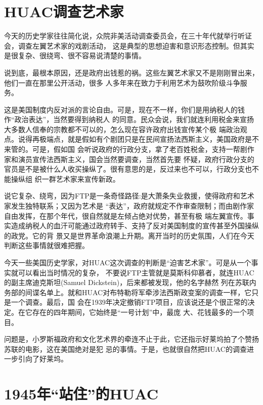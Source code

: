 \documentclass[10pt]{article}
\begin{document}
{

\pagebreak
\section{HUAC调查艺术家}

今天的历史学家往往简化说，众院非美活动调查委员会，在三十年代就举行听证会，调查左翼艺术家的戏剧活动，
这是典型的思想迫害和意识形态控制。但其实是很复杂、很绕弯、很不容易说清楚的事情。

说到底，最根本原因，还是政府出钱惹的祸。这些左翼艺术家又不是刚刚冒出来，他们一直在那里公开活动，很多
人多年来在致力于利用艺术为鼓吹阶级斗争服务。

这是美国制度内反对派的言论自由。可是，现在不一样，你们是用纳税人的钱作``政治表达''，当然要得到纳税人
的同意。民众会说，我们就连利用税金来宣扬大多数人信奉的宗教都不可以的，怎么现在容许政府出钱宣传某个极
端政治观点。说得再极端点，就是假如有个剧团只是在民间宣扬法西斯主义，美国政府是不来管的。可是，假如国
会听说政府的行政分支，拿了老百姓税金，支持一帮剧作家和演员宣传法西斯主义，国会当然要调查，当然首先要
怀疑，政府行政分支的官员是不是被什么人收买操纵了。很有意思的是，反过来也不可以，行政分支也不能操纵组
织一群艺术家来宣传新政。

说它复杂、绕弯，因为FTP是一条奇怪路径:是大萧条失业救援，使得政府和艺术家发生独特联系；又因为艺术是
``表达''，政府就规定不作审查限制；而由剧作家自由发挥，在那个年代，很自然就是左倾占绝对优势，甚至有极
端左翼宣传。事实造成纳税人的血汗可能通过政府转手、支持了反对美国制度的宣传甚至外国操纵的政党。它的背
景又是世界革命浪潮上升期。离开当时的历史氛围，人们在今天判断这些事情就很难把握。

今天一些美国历史学家，对HUAC这次调查的判断是``迫害艺术家''。可是从一个事实就可以看出当时情况的复杂，
不要说FTP主管就是莫斯科仰慕者，就连HUAC的副主席迪克斯坦(Samuel Dickstein)，后来都被发现，他的名字赫然
列在苏联内务部的间谍名单上。就和HUAC对布特勒将军牵涉法西斯政变案的调查一样，它只是一个调查。最后，国
会在1939年决定撤销FTP项目，应该说还是个很正常的决定。在它存在的四年期间，它始终是``一号计划''中，最庞
大、花钱最多的一个项目。

问题是，小罗斯福政府和文化艺术界的牵连不止于此，它还指示好莱坞拍了个赞扬苏联的电影，这在美国绝对是犯
忌的事情。于是，也就很自然把HUAC的调查进一步引向了好莱坞。

\pagebreak
\section{1945年``站住''的HUAC}

}
\end{document}

